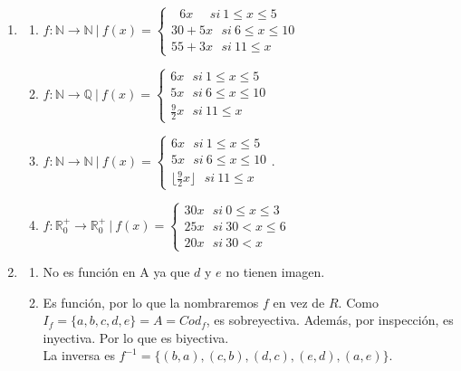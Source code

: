 \documentclass[a4paper]{article}
\newcommand{\exercise}{\item}
\begin{document}
\begin{enumerate}
\begin{enumerate} [label=(\alph*)]
		\item No cumple la condición de unicidad. En distintos días una paloma puede perder o ganar plumas. Notar que si se considera la cantidad de plumas que tiene una paloma en un momento dado, sí es función.
		\item Es función, toda ciudad está en una única provincia. $D_f$: ciudades de la Argentina. $Cod_f$: provincias. $f:D_f \to Cod_f|~$\textit{$y$ es la provincia en la que está $x$}.
		\item No cumple la condición de existencia. Hay ciudades que no son capitales de ninguna provincia.
\end{enumerate}\exercise\begin{enumerate} [label=(\alph*)]		\item $f: \mathbb{N} \to \mathbb{N} ~|~ f(x)=\left\{\begin{matrix}~~~6x~~~ ~~~si~ 1\leq x\leq 5 \\30+5x ~~~si~ 6\leq x\leq 10 \\55+3x ~~~si~ 11\leq x~~~~\end{matrix}\right.$
		\item $f: \mathbb{N} \to \mathbb{Q} ~|~ f(x)=\left\{\begin{matrix}6x ~~~si~ 1\leq x\leq 5 \\5x ~~~si~ 6\leq x\leq 10 \\\frac{9}{2}x ~~~si~ 11\leq x~~~~\end{matrix}\right.$
		\item $f: \mathbb{N} \to \mathbb{N} ~|~ f(x)=\left\{\begin{matrix}6x ~~~si~ 1\leq x\leq 5 \\5x ~~~si~ 6\leq x\leq 10 \\ \lfloor\frac{9}{2}x\rfloor ~~~si~ 11\leq x~~~~\end{matrix}\right.$.
		\item $f: \mathbb{R}^{+}_{0} \to \mathbb{R}^{+}_{0} ~|~ f(x)=\left\{\begin{matrix}30x ~~~si~ 0\leq x\leq 3 \\25x ~~~si~ 30 < x\leq 6 \\ 20x ~~~si~ 30 < x~~~~\end{matrix}\right.$
\end{enumerate}\exercise\begin{enumerate} [label=(\alph*)]		\item No es función en A ya que $d$ y $e$ no tienen imagen.
		\item Es función, por lo que la nombraremos $f$ en vez de $R$. Como $I_f=\{a,b,c,d,e\}=A=Cod_f$, es sobreyectiva. Además, por inspección, es inyectiva. Por lo que es biyectiva. \\ La inversa es $f^{-1}=\{(b,a), (c,b), (d,c), (e,d), (a,e)\}$.

\end{enumerate}
\end{enumerate}
\end{document}
